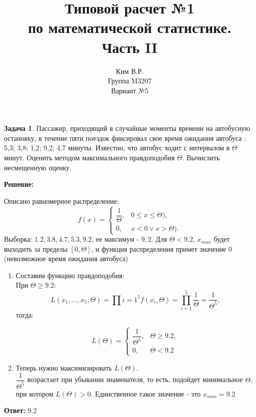\documentclass[a4paper,12pt]{article}
\title{Типовой расчет №1 \\ по математической статистике. \\ Часть II}
\author{Ким В.Р. \\ Группа M3207 \\ Вариант №5}
\date{}
\theoremstyle{definition}
\newtheorem{problem}{Задача}\setlength{\parindent}{0pt}
\newenvironment{solution}
{\begin{shaded}\textbf{Решение:}\par\setlength{\parindent}{0pt}}
{\end{shaded}}
\newenvironment{answer}
{\par\noindent\textbf{Ответ:}}
{\par}
\begin{document}
\maketitle

\begin{problem}
    Пассажир, приходящий в случайные моменты времени на автобусную остановку, в течение
    пяти поездок фиксировал свое время ожидания автобуса : 5,3; 3,8; 1,2; 9,2; 4,7 минуты.
    Известно, что автобус ходит с интервалом в \( \Theta \) минут. Оценить методом максимального
    правдоподобия \( \Theta \). Вычислить несмещенную оценку.

    \begin{solution}
        Описано равномерное распределение:
        \begin{equation}
            f(x) = 
            \begin{cases}
                \dfrac{1}{\Theta}, & 0 \leq x \leq \Theta), \\
                0,                 & x < 0 \lor x > \Theta).
            \end{cases}
        \end{equation}
        Выборка: \( 1.2, 3.8, 4.7, 5.3, 9.2 \), ее максимум - \(9,2\). 
        Для \(\Theta < 9.2\), \(x_{max}\) будет выходить за пределы \( [0,\Theta] \), 
        и функция распределения примет значение 0 (невозможное время ожидания автобуса)\\

        \begin{enumerate}
            \item Составим функцию правдоподобия: \\
                При \(\Theta \geq 9.2\):
                \[ L(x_1, \dots, x_5, \Theta) = \prod{i=1}^5 f(x_i, \Theta) = \prod^5_{i=1} \frac{1}{\Theta} = \frac{1}{\Theta^5}, \] тогда:

                \begin{equation}
                    L(\Theta) = 
                    \begin{cases}
                        \dfrac{1}{\Theta^5}, & \Theta \geq 9.2, \\
                        0,                  & \Theta < 9.2
                    \end{cases}
                \end{equation}
            \item  Теперь нужно максимизировать \( L(\Theta)\).\\
                   \(\dfrac{1}{\Theta^5}\) возрастает при убывании знаменателя, то есть,
                   подойдет минимальное \(\Theta\), при котором \(L(\Theta) > 0\). 
                   Единственное такое значение - это \(x_{max} = 9.2\)
        \end{enumerate}
    \end{solution}

    \begin{answer}
        9.2
    \end{answer}

\end{problem}
\end{document}
